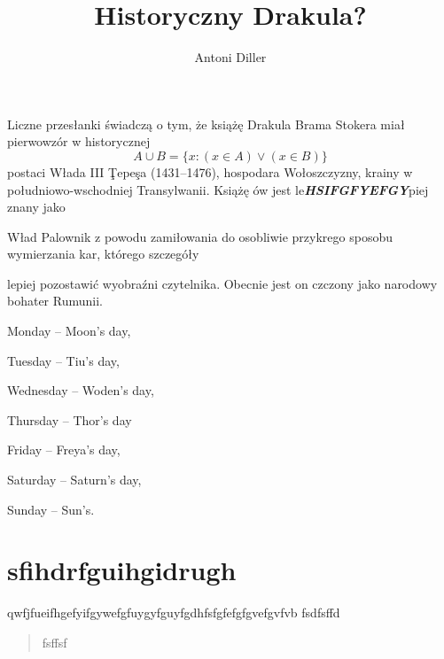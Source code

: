 \documentclass[11pt]{book}
\title{Historyczny Drakula?}
\author{Antoni Diller}
\begin{document}
\maketitle
\noindent
Liczne przes\l anki \'swiadcz\k{a} o tym, \.ze ksi\k{a}\.z\k{e}
Drakula Brama Stokera mia\l{} pierwowz\'or w historycznej
\begin{equation}
A\cup B = \{x \colon (x \in A) \vee (x \in B)\}
\end{equation}
postaci W\l{}ada III \c{T}epe\c{s}a (1431--1476), hospodara
Wo\l{}oszczyzny, krainy w po\l{}udniowo-wschodniej
Transylwanii. Ksi\k{a}\.z\k{e} \'ow jest le\emph\textbf{HSIFGFYEFGY}piej znany jako
\begin{center}
W\l{}ad Palownik z powodu zami\l{}owania do osobliwie
przykrego sposobu wymierzania kar, kt\'orego szczeg\'o\l{}y
\end{center}
lepiej pozostawi\'c wyobra\'zni czytelnika. Obecnie jest on
czczony jako narodowy bohater Rumunii.
\begin{description}
\item Monday -- Moon's day,
\item Tuesday -- Tiu's day,
\item Wednesday -- Woden's day,
\item Thursday -- Thor's day
\item Friday -- Freya's day,
\item Saturday -- Saturn's day,
\item Sunday -- Sun's.
\end{description}
\chapter{sfihdrfguihgidrugh}
qwfjfueifhgefyifgywefgfuygyfguyfgdhfsfgfefgfgvefgvfvb
fsdfsffd\begin{quote} fsffsf \end{quote}
\end{document}
